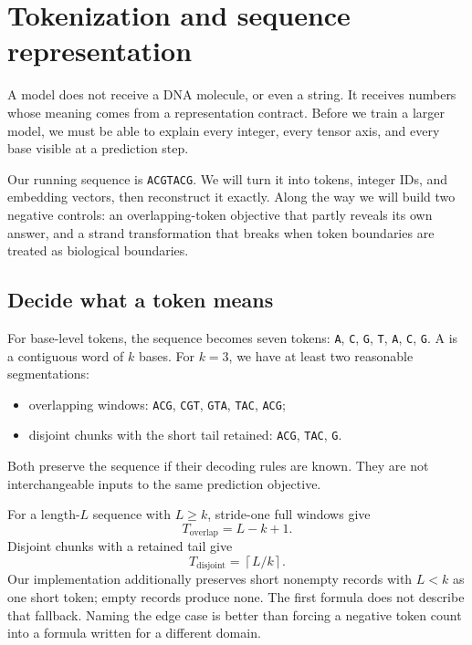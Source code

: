 \chapter{Tokenization and sequence representation}

A model does not receive a DNA molecule, or even a string. It receives
numbers whose meaning comes from a representation contract. Before we
train a larger model, we must be able to explain every integer, every
tensor axis, and every base visible at a prediction step.

Our running sequence is \texttt{ACGTACG}. We will turn it into tokens,
integer IDs, and embedding vectors, then reconstruct it exactly. Along the
way we will build two negative controls: an overlapping-token objective
that partly reveals its own answer, and a strand transformation that breaks
when token boundaries are treated as biological boundaries.

\section{Decide what a token means}

For base-level tokens, the sequence becomes seven tokens:
\texttt{A}, \texttt{C}, \texttt{G}, \texttt{T}, \texttt{A}, \texttt{C},
\texttt{G}. A  is a contiguous word of $k$ bases. For $k=3$,
we have at least two reasonable segmentations:
\begin{itemize}
\item overlapping windows: \texttt{ACG}, \texttt{CGT}, \texttt{GTA},
\texttt{TAC}, \texttt{ACG};
\item disjoint chunks with the short tail retained: \texttt{ACG},
\texttt{TAC}, \texttt{G}.
\end{itemize}
Both preserve the sequence if their decoding rules are known. They are
not interchangeable inputs to the same prediction objective.


For a length-$L$ sequence with $L\geq k$, stride-one full windows give
\begin{equation}
T_{\mathrm{overlap}}=L-k+1.
\end{equation}
Disjoint chunks with a retained tail give
\begin{equation}
T_{\mathrm{disjoint}}=\left\lceil L/k\right\rceil.
\end{equation}
Our implementation additionally preserves short nonempty records with
$L<k$ as one short token; empty records produce none. The first formula
does not describe that fallback. Naming the edge case is better than forcing
a negative token count into a formula written for a different domain.

